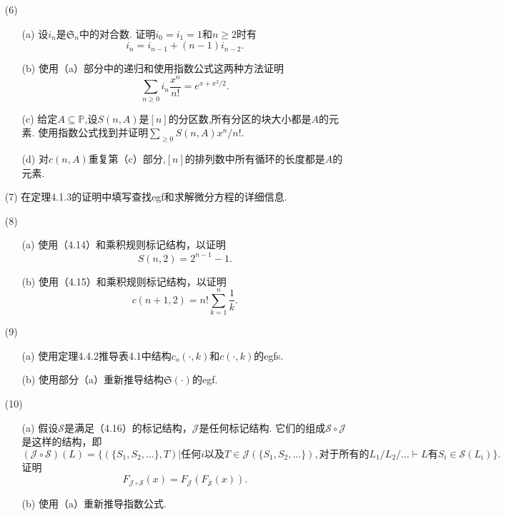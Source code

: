 \documentclass[a4paper,12pt]{ctexbook}
\begin{document}
\begin{enumerate}
	\item[(6)]
	\begin{enumerate}
		\item[(a)] 设$i_n$是$\mathfrak{S}_n$中的对合数.  证明$i_0=i_1=1$和$n\ge2$时有
		$$
		i_n=i_{n-1}+(n-1)i_{n-2}. 
		$$
		\item[(b)] 使用（a）部分中的递归和使用指数公式这两种方法证明
		$$
		\sum_{n\geq0}i_n\frac{x^n}{n!}=e^{x+x^{2}/2}. 
		$$
		\item[(c)] 给定$A\subseteq\mathbb{P}$,设$S(n,A)$是$[n]$的分区数,所有分区的块大小都是$A$的元素.  使用指数公式找到并证明$\sum_{\geq0}S(n,A)x^n/n!. $
		\item[(d)] 对$c(n,A)$重复第（c）部分,$[n]$的排列数中所有循环的长度都是$A$的元素. 
	\end{enumerate}
\end{enumerate}

\begin{enumerate}
	\item[(7)] 在定理4.1.3的证明中填写查找egf和求解微分方程的详细信息.  
\end{enumerate}

\begin{enumerate}
	\item[(8)]
	\begin{enumerate}
		\item[(a)] 使用（4.14）和乘积规则标记结构，以证明$$S(n,2)=2^{n-1}-1. $$
		\item[(b)] 使用（4.15）和乘积规则标记结构，以证明$$c(n+1,2)=n!\sum_{k=1}^n\frac{1}{k}. $$
	\end{enumerate}
\end{enumerate}

\begin{enumerate}
	\item[(9)]
	\begin{enumerate}
		\item[(a)] 使用定理4.4.2推导表4.1中结构$c_o(\cdot,k)$和$c(\cdot,k)$的egfs. 
		\item[(b)] 使用部分（a）重新推导结构$\mathfrak{S}(\cdot)$的egf. 
	\end{enumerate}
\end{enumerate}

\begin{enumerate}
	\item[(10)]
	\begin{enumerate}
		\item[(a)] 假设$\mathcal{S}$是满足（4.16）的标记结构，$\mathcal{J}$是任何标记结构.  
		它们的组成$\mathcal{S}\circ\mathcal{J}$是这样的结构，即
		$$
		(\mathcal{J}\circ\mathcal{S})(L)		
		=\{
		(\{S_1,S_2,\dots\},T)|
		\text{任何}i\text{以及}T\in\mathcal{J}(\{S_1,S_2,\dots\}),
		\text{对于所有的}L_1/L_2/\dots\vdash L\text{有}S_i\in \mathcal{S}(L_i)
		\}. 
		$$		
		证明$$F_{\mathcal{J}\circ\mathcal{S}}(x)=F_{\mathcal{J}}(F_{\bar{\mathcal{S}}}(x)). $$
		\item[(b)] 使用（a）重新推导指数公式. 
	\end{enumerate}
\end{enumerate}
\end{document}
